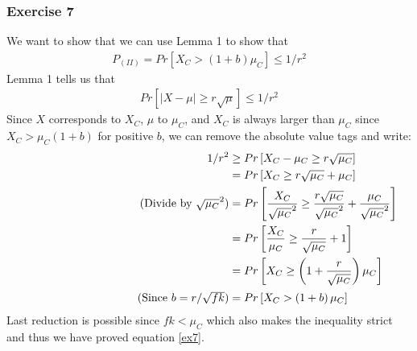 \documentclass[a4paper]{article}
\newcommand\abs[1]{\left|#1\right|}
\newcommand{\comment}[1]{%
  \text{\phantom{(#1)}} \tag{#1}}
\begin{document}
\subsubsection*{Exercise 7}
We want to show that we can use Lemma 1 to show that
\begin{align}\label{ex7}
P_{(II)} = Pr\left[ X_C > (1+b)\mu_C  \right] \leq 1/r^2
\end{align}
Lemma 1 tells us that
\begin{align*}
Pr\left[ \abs{X-\mu} \geq r\sqrt{\mu} \right] \leq 1/r^2
\end{align*}
Since $X$ corresponds to $X_C$, $\mu$ to $\mu_C$, and $X_C$ is always larger than $\mu_C$ since $X_C>\mu_C(1+b)$ for positive $b$, we can remove the absolute value tags and write:
\begin{align*}
1/r^2 &\geq Pr\left[ X_C-\mu_C \geq r\sqrt{\mu_C} \right] \\
&= Pr\left[ X_C \geq r\sqrt{\mu_C}+\mu_C \right] \\
\comment{Divide by $\sqrt{\mu_C}^2$} &= Pr\left[ \frac{X_C}{\sqrt{\mu_C}^2} \geq \frac{r\sqrt{\mu_C}}{\sqrt{\mu_C}^2}+\frac{\mu_C}{\sqrt{\mu_C}^2} \right] \\
&= Pr\left[ \frac{X_C}{\mu_C} \geq \frac{r}{\sqrt{\mu_C}}+1 \right] \\
&= Pr\left[ X_C \geq \left( 1+\frac{r}{\sqrt{\mu_C}} \right) \mu_C \right] \\
\comment{Since $b=r/\sqrt{fk}$} &= Pr\left[ X_C > \left( 1+b \right) \mu_C \right]
\end{align*}
Last reduction is possible since $fk<\mu_C$ which also makes the inequality strict and thus we have proved equation \ref{ex7}.
\end{document}

